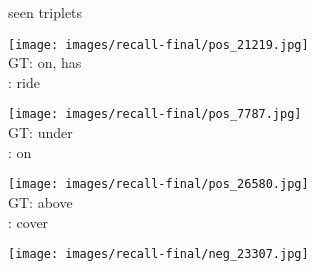 \documentclass[10pt,twocolumn,letterpaper]{article}
\begin{document}
\begin{figure*}[t]
\begin{minipage}[b]{0.005\textwidth}
    	\centering
    	\begin{turn}{90}
    	seen triplets
    	\end{turn}
    	\vspace{3.5ex}
    \end{minipage}
    \hspace{0.01\textwidth}
\begin{minipage}[b]{0.18\textwidth}
    	\centering
\texttt{[image: images/recall-final/pos\_21219.jpg]}\\
       	\small{
       	\vspace{0.2ex}
       	GT: on, has\\
       	\cite{Lu16}: ride
       	}
       	\vspace{0.3ex}
    \end{minipage}
    \hspace{0.005\textwidth}
\begin{minipage}[b]{0.18\textwidth}
       \centering
       \texttt{[image: images/recall-final/pos\_7787.jpg]}\\
       \vspace{0.2ex}
       \small{
       GT: under\\
       \cite{Lu16}: on
       }
       \vspace{0.3ex}
    \end{minipage}
    \hspace{0.005\textwidth}
\begin{minipage}[b]{0.18\textwidth}
    	\centering
       	\texttt{[image: images/recall-final/pos\_26580.jpg]}\\
       	\vspace{0.2ex}
       	\small{
       	GT: above\\
       	\cite{Lu16}: cover
       	}
       	\vspace{0.3ex}
    \end{minipage}
    \hspace{0.005\textwidth}
\begin{minipage}[b]{0.18\textwidth}
    	\centering
       	\texttt{[image: images/recall-final/neg\_23307.jpg]}\\
       	\vspace{0.2ex}

\end{minipage}
\end{figure*}
\end{document}
